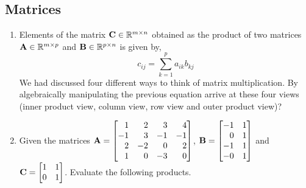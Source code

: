 
\subsection*{Matrices}
\begin{enumerate}[resume]
    \item Elements of the matrix $\mathbf{C} \in \mathbb{R}^{m \times n}$ obtained as the product of two matrices $\mathbf{A} \in \mathbb{R}^{m \times p}$ and $\mathbf{B} \in \mathbb{R}^{p \times n}$ is given by,
    \[ c_{ij} = \sum_{k=1}^{p}a_{ik}b_{kj} \]
    We had discussed four different ways to think of matrix multiplication. By algebraically manipulating the previous equation arrive at these four views (inner product view, column view, row view and outer product view)? 

    \item Given the matrices $\mf{A} = \begin{bmatrix*}[r]
    1 & 2 & 3 & 4\\
    -1 & 3 & -1 & -1\\
    2 & -2 & 0 & 2\\
    1 & 0 & -3 & 0\\
    \end{bmatrix*}$, $\mf{B} = \begin{bmatrix*}[r]
    -1 & 1\\
    0 & 1\\
    -1 & 1\\
    -0 & 1\\
    \end{bmatrix*}$ and $\mf{C} = \begin{bmatrix*}[r]
    1 & 1\\
    0 & 1\\
    \end{bmatrix*}$. Evaluate the following products.



\end{enumerate}
